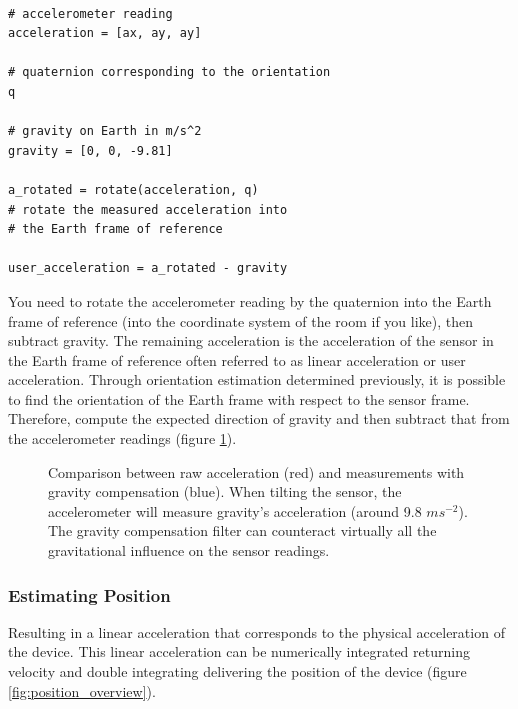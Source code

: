 \lstset{language=Python}
\begin{lstlisting}[frame=single]  % Start your code-block
    
# accelerometer reading
acceleration = [ax, ay, ay]  

# quaternion corresponding to the orientation
q                            

# gravity on Earth in m/s^2
gravity = [0, 0, -9.81]      

a_rotated = rotate(acceleration, q) 
# rotate the measured acceleration into
# the Earth frame of reference

user_acceleration = a_rotated - gravity

\end{lstlisting}

You need to rotate the accelerometer reading by the quaternion into the Earth frame of reference (into the coordinate system of the room if you like), then subtract gravity. The remaining acceleration is the acceleration of the sensor in the Earth frame of reference often referred to as linear acceleration or user acceleration. Through orientation estimation determined previously, it is possible to find the orientation of the Earth frame with respect to the sensor frame. Therefore, compute the expected direction of gravity and then subtract that from the accelerometer readings (figure \ref{fig:gavity_compensation}).


\begin{figure}[!h]
  \centering
  \resizebox{0.8\linewidth}{!}{}
  \caption{Comparison between raw acceleration (red) and measurements with gravity compensation (blue). When tilting the sensor, the accelerometer will measure  gravity's acceleration (around 9.8 $ms^{-2}$). The gravity compensation filter can counteract virtually all the gravitational influence on the sensor readings.}
  \label{fig:gavity_compensation}
\end{figure}

\subsubsection{Estimating Position}

Resulting in a linear acceleration that corresponds to the physical acceleration of the device. This linear acceleration can be numerically integrated returning velocity and double integrating delivering the position of the device (figure \ref{fig:position_overview}).

